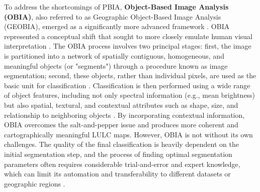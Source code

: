 \documentclass{report}
\begin{document}
To address the shortcomings of PBIA, \textbf{Object-Based Image Analysis (OBIA)}, also referred to as Geographic Object-Based Image Analysis (GEOBIA), emerged as a significantly more advanced framework \parencites[p.~338f.]{CostaEtAlSupervisedmethodsimagesegmentationaccuracyassessmentlandcovermapping2018}. OBIA represented a conceptual shift that sought to more closely emulate human visual interpretation \parencites[p.~309]{KotaridisLazaridouRemotesensingimagesegmentationadvancesmetaanalysis2021a}. The OBIA process involves two principal stages: first, the image is partitioned into a network of spatially contiguous, homogeneous, and meaningful objects (or "segments") through a procedure known as image segmentation; second, these objects, rather than individual pixels, are used as the basic unit for classification \parencites[p.~338f.]{CostaEtAlSupervisedmethodsimagesegmentationaccuracyassessmentlandcovermapping2018}. Classification is then performed using a wide range of object features, including not only spectral information (e.g., mean brightness) but also spatial, textural, and contextual attributes such as shape, size, and relationship to neighboring objects \parencites[p.~2]{NeupaneEtAlDeepLearningBasedSemanticSegmentationUrbanFeaturesSatelliteImagesReviewMetaAnalysis2021}. By incorporating contextual information, OBIA overcomes the salt-and-pepper issue and produces more coherent and cartographically meaningful LULC maps. However, OBIA is not without its own challenges. The quality of the final classification is heavily dependent on the initial segmentation step, and the process of finding optimal segmentation parameters often requires considerable trial-and-error and expert knowledge, which can limit its automation and transferability to different datasets or geographic regions \parencites[p.~316;]{KotaridisLazaridouRemotesensingimagesegmentationadvancesmetaanalysis2021a}[p.~2]{NeupaneEtAlDeepLearningBasedSemanticSegmentationUrbanFeaturesSatelliteImagesReviewMetaAnalysis2021}.
\end{document}
